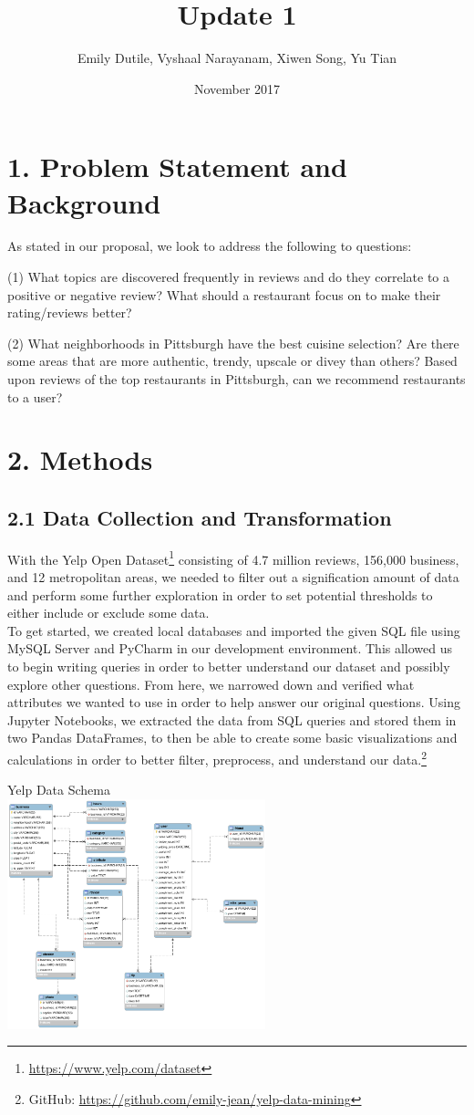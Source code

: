 \documentclass{neu_handout}
\title{Update 1}
\author{Emily Dutile, Vyshaal Narayanam, Xiwen Song, Yu Tian}
\date{November 2017}
\begin{document}
\section*{1. Problem Statement and Background}
As stated in our proposal, we look to address the following to questions:

(1) What topics are discovered frequently in reviews and do they correlate to a positive or negative review? What should a restaurant focus on to make their rating/reviews better?

(2) What neighborhoods in Pittsburgh have the best cuisine selection? Are there some areas that are more authentic, trendy, upscale or divey than others? Based upon reviews of the top restaurants in Pittsburgh, can we recommend restaurants to a user?

\section*{2. Methods}

\subsection*{2.1 Data Collection and Transformation}
With the Yelp Open Dataset\footnote{\url{https://www.yelp.com/dataset}} consisting of 4.7 million reviews, 156,000 business, and 12 metropolitan areas, we needed to filter out a signification amount of data and perform some further exploration in order to set potential thresholds to either include or exclude some data.\\
To get started, we created local databases and imported the given SQL file using MySQL Server and PyCharm in our development environment. This allowed us to begin writing queries in order to better understand our dataset and possibly explore other questions. From here, we narrowed down and verified what attributes we wanted to use in order to help answer our original questions.  Using Jupyter Notebooks, we extracted the data from SQL queries and stored them in two Pandas DataFrames, to then be able to create some basic visualizations and calculations in order to better filter, preprocess, and understand our data.\footnote{GitHub: \url{https://github.com/emily-jean/yelp-data-mining}}\\

\begin{center}
Yelp Data Schema\\
\includegraphics[width=75mm,scale=0.4]{schema}\\
\end{center}
\end{document}
